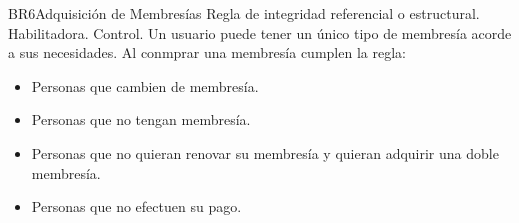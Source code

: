 \begin{BussinesRule}{BR6}{Adquisición de Membresías}
	\BRitem[Tipo:] Regla de integridad referencial o estructural.
	\BRitem[Clase:] Habilitadora. 
	\BRitem[Nivel:] Control. %
	\BRitem[Descripción:] Un usuario puede tener un único tipo de membresía acorde a sus necesidades.
	 Al conmprar una membresía cumplen la regla:
		\begin{itemize}
			\item Personas que cambien de membresía.
			\item Personas que no tengan membresía.
		\end{itemize}
	
		\begin{itemize}
			\item Personas que no quieran renovar su membresía y quieran adquirir una doble membresía.
			\item Personas que no efectuen su pago.
			
		\end{itemize}
	
\end{BussinesRule}

